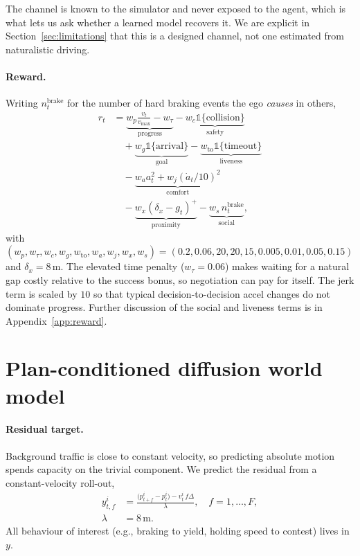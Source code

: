 \documentclass[conference]{IEEEtran}
\begin{document}
The channel is known to the simulator and never exposed to the agent, which is
what lets us ask whether a learned model recovers it. We are explicit in
Section~\ref{sec:limitations} that this is a designed channel, not one estimated
from naturalistic driving.

\paragraph{Reward.} Writing $n^{\text{brake}}_t$ for the number of hard braking
events the ego \emph{causes} in others,
\begin{align}
r_t &= \underbrace{w_p \tfrac{v_t}{v_{\max}} - w_\tau}_{\text{progress}}
- \underbrace{w_c \mathbb{1}\{\text{collision}\}}_{\text{safety}} \nonumber \\
&\quad + \underbrace{w_g \mathbb{1}\{\text{arrival}\}}_{\text{goal}}
- \underbrace{w_{\text{to}} \mathbb{1}\{\text{timeout}\}}_{\text{liveness}} \nonumber \\
&\quad - \underbrace{w_a a_t^2 + w_j (\dot a_t / 10)^2}_{\text{comfort}} \nonumber \\
&\quad - \underbrace{w_x (\delta_x - g_t)^+}_{\text{proximity}}
- \underbrace{w_s\, n^{\text{brake}}_t}_{\text{social}} ,
\label{eq:reward}
\end{align}
with $(w_p, w_\tau, w_c, w_g, w_{\text{to}}, w_a, w_j, w_x, w_s) =
(0.2, 0.06, 20, 20, 15, 0.005, 0.01, 0.05, 0.15)$ and $\delta_x = 8$\,m.
The elevated time penalty ($w_\tau{=}0.06$) makes waiting for a natural gap
costly relative to the success bonus, so negotiation can pay for itself.
The jerk term is scaled by $10$ so that typical decision-to-decision accel
changes do not dominate progress. Further discussion of the social and
liveness terms is in Appendix~\ref{app:reward}.

\section{Plan-conditioned diffusion world model}
\label{sec:model}

\paragraph{Residual target.} Background traffic is close to constant velocity, so
predicting absolute motion spends capacity on the trivial component. We predict
the residual from a constant-velocity roll-out,
\begin{align}
y^i_{t,f} &= \frac{\big(p^i_{t+f} - p^i_t\big) - v^i_t\, f \Delta}{\lambda},
\quad f = 1,\dots,F, \nonumber \\
\lambda &= 8\,\text{m}.
\label{eq:residual}
\end{align}
All behaviour of interest (e.g., braking to yield, holding speed to contest)
lives in $y$.
\end{document}
